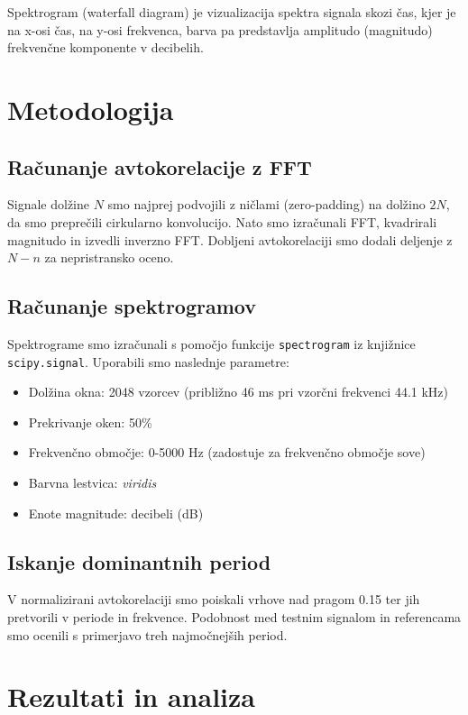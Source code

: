 \documentclass[12pt,a4paper]{article}
\begin{document}
Spektrogram (waterfall diagram) je vizualizacija spektra signala skozi čas, kjer je na x-osi čas, na y-osi frekvenca, barva pa predstavlja amplitudo (magnitudo) frekvenčne komponente v decibelih.

\section{Metodologija}

\subsection{Računanje avtokorelacije z FFT}
Signale dolžine $N$ smo najprej podvojili z ničlami (zero-padding) na dolžino $2N$, da smo preprečili cirkularno konvolucijo. Nato smo izračunali FFT, kvadrirali magnitudo in izvedli inverzno FFT. Dobljeni avtokorelaciji smo dodali deljenje z $N-n$ za nepristransko oceno.

\subsection{Računanje spektrogramov}
Spektrograme smo izračunali s pomočjo funkcije \texttt{spectrogram} iz knjižnice \texttt{scipy.signal}. Uporabili smo naslednje parametre:
\begin{itemize}
    \item Dolžina okna: 2048 vzorcev (približno 46 ms pri vzorčni frekvenci 44.1 kHz)
    \item Prekrivanje oken: 50\%
    \item Frekvenčno območje: 0-5000 Hz (zadostuje za frekvenčno območje sove)
    \item Barvna lestvica: \textit{viridis}
    \item Enote magnitude: decibeli (dB)
\end{itemize}

\subsection{Iskanje dominantnih period}
V normalizirani avtokorelaciji smo poiskali vrhove nad pragom 0.15 ter jih pretvorili v periode in frekvence. Podobnost med testnim signalom in referencama smo ocenili s primerjavo treh najmočnejših period.

\section{Rezultati in analiza}
\end{document}
